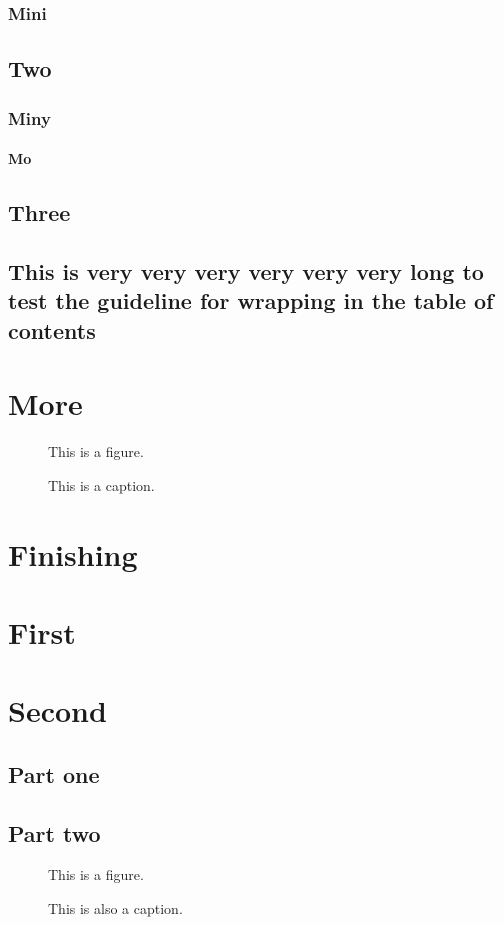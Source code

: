 \documentclass{utthesis}
\begin{document}
\subsection{Mini}
\section{Two}
\subsection{Miny}
\subsubsection{Mo}
\section{Three}
\section{This is very very very very very very long to test the guideline for wrapping in the table of contents}



\chapter{More}
\lipsum[3]
\begin{figure}
This is a figure.
\caption[This]{This is a caption.}
\end{figure}

\chapter{Finishing}
\lipsum[3]

\begin{appendix}

\chapter{First}
\lipsum[3]

\chapter{Second}
\section{Part one}
\lipsum[3]
\section{Part two}
\begin{figure}
This is a figure.
\caption[That]{This is also a caption.}
\end{figure}

\end{appendix}
\end{document}
